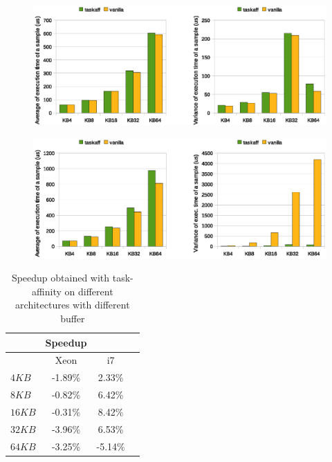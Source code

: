 \begin{figure}[htbp]
\centering
\includegraphics[width=\widefigure]{images/time/time_avg_var_Xeon.eps}
\caption{}
\label{fig:avg_var_xeon}
\end{figure}

\newpage

\begin{figure}[htbp]
\centering
\includegraphics[width=\widefigure]{images/time/time_avg_var_i7.eps}
\caption{}
\label{fig:avg_var_i7}
\end{figure}

\begin{table}[htbp]
\begin{center}
\begin{tabular}{l|c|c|c}
	\hline
	& Speedup \\ \hline
	& Xeon & i7 \\ \hline
	$4KB$  & -1.89\% & 2.33\% \\ \hline
	$8KB$  & -0.82\% & 6.42\% \\ \hline
	$16KB$ & -0.31\% & 8.42\% \\ \hline
	$32KB$ & -3.96\% & 6.53\% \\ \hline
	$64KB$ & -3.25\% & -5.14\% \\ \hline
\end{tabular}
\caption{Speedup obtained with task-affinity on different architectures with different buffer}
\label{tab:speedup_xeon_i7}
\end{center}
\end{table}

